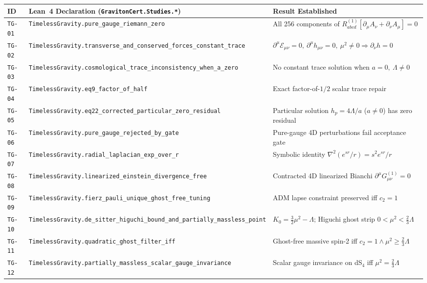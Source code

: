 \documentclass[11pt,a4paper]{article}
\theoremstyle{plain}
\theoremstyle{remark}
\newcommand{\dd}{\partial}
\newcommand{\code}[1]{\texttt{\small #1}}
\begin{document}
\begin{table}[t]
\centering
\scriptsize
\renewcommand{\code}[1]{\texttt{#1}}
\setlength{\tabcolsep}{4pt}
\renewcommand{\arraystretch}{1.16}
\begin{tabular}{@{}l >{\tiny}l >{\raggedright\arraybackslash}p{7.1cm}@{}}
\toprule
\textbf{ID} & {\scriptsize\textbf{Lean~4 Declaration (\code{GravitonCert.Studies.*})}} & \textbf{Result Established} \\
\midrule
\code{TG-01} & \code{TimelessGravity.pure\_gauge\_riemann\_zero} & All 256 components of $R^{(1)}_{abcd}[\dd_\mu A_\nu+\dd_\nu A_\mu]=0$ \\
\code{TG-02} & \code{TimelessGravity.transverse\_and\_conserved\_forces\_constant\_trace} & $\dd^\mu\mathcal{E}_{\mu\nu}=0,\ \dd^\mu h_{\mu\nu}=0,\ \mu^2\neq 0 \Rightarrow \dd_\nu h = 0$ \\
\code{TG-03} & \code{TimelessGravity.cosmological\_trace\_inconsistency\_when\_a\_zero} & No constant trace solution when $a=0,\ \Lambda\neq 0$ \\
\code{TG-04} & \code{TimelessGravity.eq9\_factor\_of\_half} & Exact factor-of-$1/2$ scalar trace repair \\
\code{TG-05} & \code{TimelessGravity.eq22\_corrected\_particular\_zero\_residual} & Particular solution $h_p = 4\Lambda/a$ ($a\neq 0$) has zero residual \\
\code{TG-06} & \code{TimelessGravity.pure\_gauge\_rejected\_by\_gate} & Pure-gauge 4D perturbations fail acceptance gate \\
\code{TG-07} & \code{TimelessGravity.radial\_laplacian\_exp\_over\_r} & Symbolic identity $\nabla^2(e^{sr}/r) = s^2 e^{sr}/r$ \\
\code{TG-08} & \code{TimelessGravity.linearized\_einstein\_divergence\_free} & Contracted 4D linearized Bianchi $\dd^\mu G^{(1)}_{\mu\nu}=0$ \\
\code{TG-09} & \code{TimelessGravity.fierz\_pauli\_unique\_ghost\_free\_tuning} & ADM lapse constraint preserved iff $c_2 = 1$ \\
\code{TG-10} & \code{TimelessGravity.de\_sitter\_higuchi\_bound\_and\_partially\_massless\_point} & $K_0 = \tfrac{3}{2}\mu^2-\Lambda$; Higuchi ghost strip $0<\mu^2<\tfrac{2}{3}\Lambda$ \\
\code{TG-11} & \code{TimelessGravity.quadratic\_ghost\_filter\_iff} & Ghost-free massive spin-2 iff $c_2=1 \wedge \mu^2 \ge \tfrac{2}{3}\Lambda$ \\
\code{TG-12} & \code{TimelessGravity.partially\_massless\_scalar\_gauge\_invariance} & Scalar gauge invariance on dS$_4$ iff $\mu^2 = \tfrac{2}{3}\Lambda$ \\

\end{tabular}
\end{table}
\end{document}
